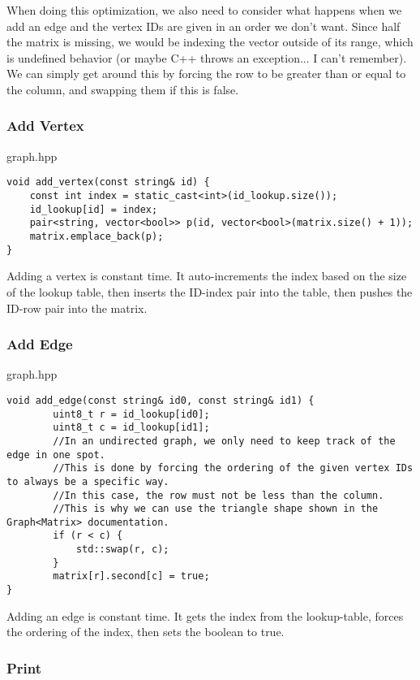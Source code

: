 \documentclass[letterpaper, 10pt,DIV=13]{scrartcl}
\numberwithin{equation}{section} %
\numberwithin{figure}{section} %
\numberwithin{table}{section} %
\begin{document}
When doing this optimization, we also need to consider what happens when we add an edge and the
vertex IDs are given in an order we don't want. Since half the matrix is missing, we would be
indexing the vector outside of its range, which is undefined behavior (or maybe C++ throws an
exception... I can't remember). We can simply get around this by forcing the row to be greater
than or equal to the column, and swapping them if this is false.

\subsubsection{Add Vertex}

graph.hpp
\begin{verbatim}
void add_vertex(const string& id) {
    const int index = static_cast<int>(id_lookup.size());
    id_lookup[id] = index;
    pair<string, vector<bool>> p(id, vector<bool>(matrix.size() + 1));
    matrix.emplace_back(p);
}
\end{verbatim}

Adding a vertex is constant time. It auto-increments the index based on the size of the lookup table, then
inserts the ID-index pair into the table, then pushes the ID-row pair into the matrix.

\subsubsection{Add Edge}

graph.hpp
\begin{verbatim}
void add_edge(const string& id0, const string& id1) {
        uint8_t r = id_lookup[id0];
        uint8_t c = id_lookup[id1];
        //In an undirected graph, we only need to keep track of the edge in one spot.
        //This is done by forcing the ordering of the given vertex IDs to always be a specific way.
        //In this case, the row must not be less than the column.
        //This is why we can use the triangle shape shown in the Graph<Matrix> documentation.
        if (r < c) {
            std::swap(r, c);
        }
        matrix[r].second[c] = true;
}
\end{verbatim}

Adding an edge is constant time. It gets the index from the lookup-table, forces the ordering of the index,
then sets the boolean to true.

\subsubsection{Print}
\end{document}
